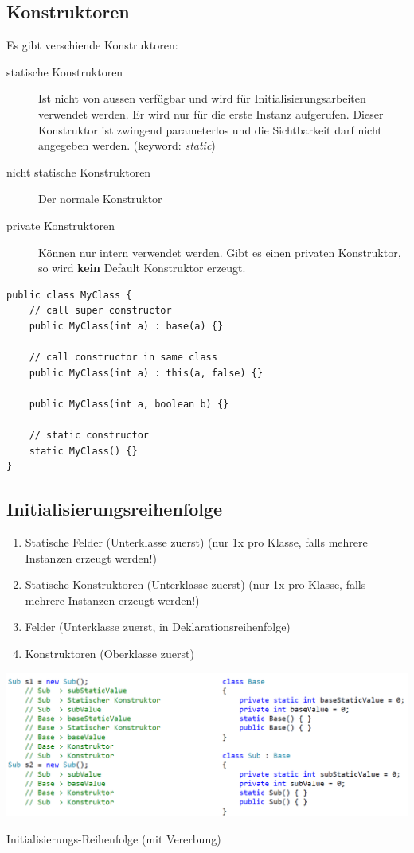 \documentclass[
a4paper,
oneside,
10pt,
fleqn,
headsepline,
toc=listofnumbered, 
bibliography=totocnumbered]{scrartcl}
\begin{document}
\subsection{Konstruktoren}
Es gibt verschiende Konstruktoren:
\begin{description}
	\item[statische Konstruktoren] Ist nicht von aussen verfügbar und wird für Initialisierungsarbeiten verwendet werden. Er wird nur für die erste Instanz aufgerufen. Dieser Konstruktor ist zwingend parameterlos und die Sichtbarkeit darf nicht angegeben werden. (keyword: \textit{static})
	\item[nicht statische Konstruktoren] Der normale Konstruktor
	\item[private Konstruktoren] Können nur intern verwendet werden. Gibt es einen privaten Konstruktor, so wird \textbf{kein} Default Konstruktor erzeugt.
\end{description}
\begin{lstlisting}
public class MyClass {
	// call super constructor
	public MyClass(int a) : base(a) {}

	// call constructor in same class
	public MyClass(int a) : this(a, false) {}
	
	public MyClass(int a, boolean b) {}
	
	// static constructor
	static MyClass() {}
}
\end{lstlisting}

\subsection{Initialisierungsreihenfolge}
\begin{enumerate}
	\item Statische Felder (Unterklasse zuerst) (nur 1x pro Klasse, falls mehrere Instanzen erzeugt werden!)
	\item Statische Konstruktoren (Unterklasse zuerst) (nur 1x pro Klasse, falls mehrere Instanzen erzeugt werden!)
	\item Felder (Unterklasse zuerst, in Deklarationsreihenfolge)
	\item Konstruktoren (Oberklasse zuerst)
\end{enumerate}


\begin{minipage}[t]{1\textwidth}
\centering
\includegraphics[width=0.9\linewidth]{images/init_order}
\caption{Initialisierungs-Reihenfolge (mit Vererbung)}
\end{minipage}
\end{document}
